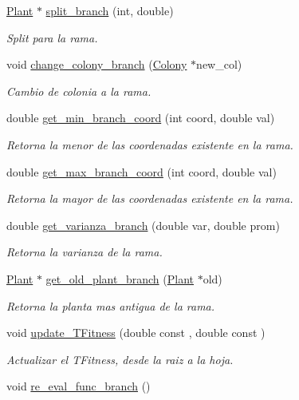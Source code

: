 \begin{DoxyCompactItemize}
\item 
\hyperlink{class_plant}{Plant} $\ast$ \hyperlink{class_plant_ab7c3c50790efd2843219e439cdf7e687}{split\+\_\+branch} (int, double)
\begin{DoxyCompactList}\small\item\em Split para la rama. \end{DoxyCompactList}\item 
void \hyperlink{class_plant_a3da8873875164b9924111020fb3a374e}{change\+\_\+colony\+\_\+branch} (\hyperlink{class_colony}{Colony} $\ast$new\+\_\+col)
\begin{DoxyCompactList}\small\item\em Cambio de colonia a la rama. \end{DoxyCompactList}\item 
double \hyperlink{class_plant_a19634cf97e315f3245130ef23ce1a670}{get\+\_\+min\+\_\+branch\+\_\+coord} (int coord, double val)
\begin{DoxyCompactList}\small\item\em Retorna la menor de las coordenadas existente en la rama. \end{DoxyCompactList}\item 
double \hyperlink{class_plant_ab827c5ca9da0923a949232e0c81bb0fe}{get\+\_\+max\+\_\+branch\+\_\+coord} (int coord, double val)
\begin{DoxyCompactList}\small\item\em Retorna la mayor de las coordenadas existente en la rama. \end{DoxyCompactList}\item 
double \hyperlink{class_plant_a46456807d2ad5b9f141af448f216b5d7}{get\+\_\+varianza\+\_\+branch} (double var, double prom)
\begin{DoxyCompactList}\small\item\em Retorna la varianza de la rama. \end{DoxyCompactList}\item 
\hyperlink{class_plant}{Plant} $\ast$ \hyperlink{class_plant_a3540c994a995d890f1d41f1646e5bfa8}{get\+\_\+old\+\_\+plant\+\_\+branch} (\hyperlink{class_plant}{Plant} $\ast$old)
\begin{DoxyCompactList}\small\item\em Retorna la planta mas antigua de la rama. \end{DoxyCompactList}\item 
void \hyperlink{class_plant_a71a465c3487f93129829b87550e83fcf}{update\+\_\+\+T\+Fitness} (double const , double const )
\begin{DoxyCompactList}\small\item\em Actualizar el T\+Fitness, desde la raiz a la hoja. \end{DoxyCompactList}\item 
\hypertarget{class_plant_a334ffc92dcb5081cf17db59c3acb58d0}{void \hyperlink{class_plant_a334ffc92dcb5081cf17db59c3acb58d0}{re\+\_\+eval\+\_\+func\+\_\+branch} ()}\label{class_plant_a334ffc92dcb5081cf17db59c3acb58d0}


\end{DoxyCompactItemize}
